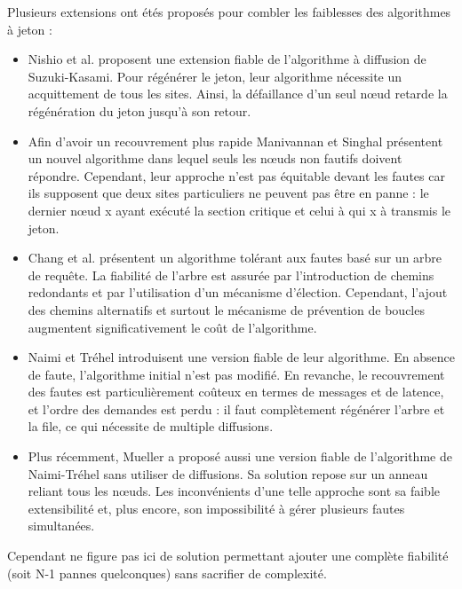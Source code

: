 Plusieurs extensions ont étés proposés pour combler les faiblesses des algorithmes à jeton :

\begin{itemize} 
\item Nishio et al. proposent une extension fiable de l'algorithme à diffusion de Suzuki-Kasami. Pour régénérer le jeton, leur algorithme nécessite un acquittement de tous les sites. Ainsi, la défaillance d'un seul nœud retarde la régénération du jeton jusqu'à son retour. 
\item Afin d'avoir un recouvrement plus rapide Manivannan et Singhal présentent un nouvel algorithme dans lequel seuls les nœuds non fautifs doivent répondre. Cependant, leur approche n'est pas équitable devant les fautes car ils supposent que deux sites particuliers ne peuvent pas être en panne : le dernier nœud x ayant exécuté la section critique et celui à qui x à transmis le jeton.
\item Chang et al. présentent un algorithme tolérant aux fautes basé sur un arbre de requête. La fiabilité de l'arbre est assurée par l'introduction de chemins redondants et par l'utilisation d'un mécanisme d'élection. Cependant, l'ajout des chemins alternatifs et surtout le mécanisme de prévention de boucles augmentent significativement le coût de l'algorithme.
\item Naimi et Tréhel introduisent une version fiable de leur algorithme. En absence de faute, l'algorithme initial n'est pas modifié. En revanche, le recouvrement des fautes est particulièrement coûteux en termes de messages et de latence, et l'ordre des demandes est perdu : il faut complètement régénérer l'arbre et la file, ce qui nécessite de multiple diffusions. 
\item Plus récemment, Mueller a proposé aussi une version fiable de l'algorithme de Naimi-Tréhel sans utiliser de diffusions. Sa solution repose sur un anneau reliant tous les nœuds.
Les inconvénients d'une telle approche sont sa faible extensibilité et, plus encore, son impossibilité à gérer plusieurs fautes simultanées.
\end{itemize}

Cependant ne figure pas ici de solution permettant ajouter une complète fiabilité (soit N-1 pannes quelconques) sans sacrifier de complexité.